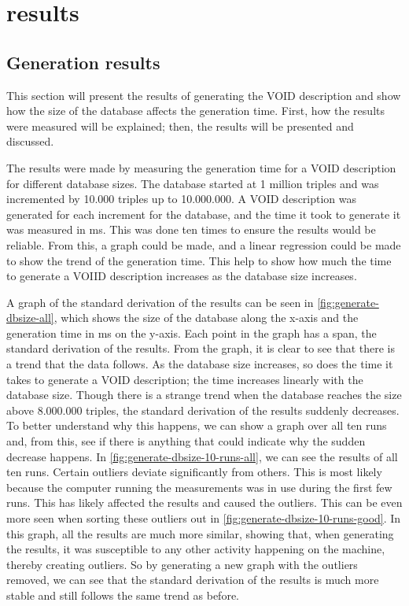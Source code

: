 \section{results}\label{sec:results}
\subsection{Generation results}\label{subsec:generation-results}
This section will present the results of generating the VOID description and show how the size of the database affects the generation time. First, how the results were measured will be explained; then, the results will be presented and discussed.

The results were made by measuring the generation time for a VOID description for different database sizes. The database started at 1 million triples and was incremented by 10.000 triples up to 10.000.000. A VOID description was generated for each increment for the database, and the time it took to generate it was measured in ms. This was done ten times to ensure the results would be reliable. From this, a graph could be made, and a linear regression could be made to show the trend of the generation time. This help to show how much the time to generate a VOIID description increases as the database size increases.

A graph of the standard derivation of the results can be seen in \autoref{fig:generate-dbsize-all}, which shows the size of the database along the x-axis and the generation time in ms on the y-axis. Each point in the graph has a span, the standard derivation of the results. From the graph, it is clear to see that there is a trend that the data follows. As the database size increases, so does the time it takes to generate a VOID description; the time increases linearly with the database size. Though there is a strange trend when the database reaches the size above 8.000.000 triples, the standard derivation of the results suddenly decreases. To better understand why this happens, we can show a graph over all ten runs and, from this, see if there is anything that could indicate why the sudden decrease happens. In \autoref{fig:generate-dbsize-10-runs-all}, we can see the results of all ten runs. Certain outliers deviate significantly from others. This is most likely because the computer running the measurements was in use during the first few runs. This has likely affected the results and caused the outliers. This can be even more seen when sorting these outliers out in \autoref{fig:generate-dbsize-10-runs-good}. In this graph, all the results are much more similar, showing that, when generating the results, it was susceptible to any other activity happening on the machine, thereby creating outliers. So by generating a new graph with the outliers removed, we can see that the standard derivation of the results is much more stable and still follows the same trend as before.

